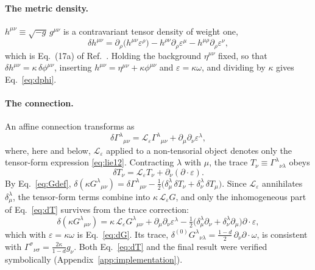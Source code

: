 \documentclass[prd,aps,preprint,nofootinbib,amsmath,amssymb,eqsecnum]{revtex4-2}
\begin{document}
\paragraph{The metric density.} $h^{\mu\nu}\equiv\sqrt{-g}\,g^{\mu\nu}$ is a contravariant
tensor density of weight one,
\begin{equation}
\delta h^{\mu\nu}=\partial_\rho\big(h^{\mu\nu}\varepsilon^\rho\big)
-h^{\rho\nu}\partial_\rho\varepsilon^\mu-h^{\mu\rho}\partial_\rho\varepsilon^\nu ,
\label{eq:dh}
\end{equation}
which is Eq.~(17a) of Ref.~\cite{BrandtMcKeon2015}. Holding the background $\eta^{\mu\nu}$
fixed, so that $\delta h^{\mu\nu}=\kappa\,\delta\phi^{\mu\nu}$, inserting
$h^{\mu\nu}=\eta^{\mu\nu}+\kappa\phi^{\mu\nu}$ and $\varepsilon=\kappa\omega$, and dividing by
$\kappa$ gives Eq.~\eqref{eq:dphi}.

\paragraph{The connection.} An affine connection transforms as
\begin{equation}
\delta\Gamma^{\lambda}{}_{\mu\nu}=\mathcal{L}_\varepsilon\Gamma^{\lambda}{}_{\mu\nu}
+\partial_\mu\partial_\nu\varepsilon^\lambda ,
\label{eq:dGamma}
\end{equation}
where, here and below, $\mathcal{L}_\varepsilon$ applied to a non-tensorial object denotes
only the tensor-form expression \eqref{eq:lie12}. Contracting $\lambda$ with $\mu$, the
trace $T_\nu\equiv\Gamma^{\lambda}{}_{\nu\lambda}$ obeys
\begin{equation}
\delta T_\nu=\mathcal{L}_\varepsilon T_\nu+\partial_\nu(\partial\!\cdot\!\varepsilon).
\label{eq:dT}
\end{equation}
By Eq.~\eqref{eq:Gdef},
$\delta(\kappa G^{\lambda}{}_{\mu\nu})=\delta\Gamma^{\lambda}{}_{\mu\nu}
-\tfrac12\big(\delta^\lambda_\mu\,\delta T_\nu+\delta^\lambda_\nu\,\delta T_\mu\big)$. Since
$\mathcal{L}_\varepsilon$ annihilates $\delta^\lambda_\mu$, the tensor-form terms combine into
$\kappa\,\mathcal{L}_\varepsilon G$, and only the inhomogeneous part of Eq.~\eqref{eq:dT}
survives from the trace correction:
\begin{equation}
\delta(\kappa G^{\lambda}{}_{\mu\nu})=\kappa\,\mathcal{L}_\varepsilon G^{\lambda}{}_{\mu\nu}
+\partial_\mu\partial_\nu\varepsilon^\lambda
-\tfrac12\big(\delta^\lambda_\mu\partial_\nu+\delta^\lambda_\nu\partial_\mu\big)\partial\!\cdot\!\varepsilon ,
\end{equation}
which with $\varepsilon=\kappa\omega$ is Eq.~\eqref{eq:dG}. Its trace,
$\delta^{(0)}G^{\lambda}{}_{\nu\lambda}=\tfrac{1-d}{2}\,\partial_\nu\partial\!\cdot\!\omega$,
is consistent with $\Gamma^{\sigma}{}_{\nu\sigma}=\frac{2\kappa}{1-d}g_\nu$. Both
Eq.~\eqref{eq:dT} and the final result were verified symbolically
(Appendix~\ref{app:implementation}).
\end{document}
